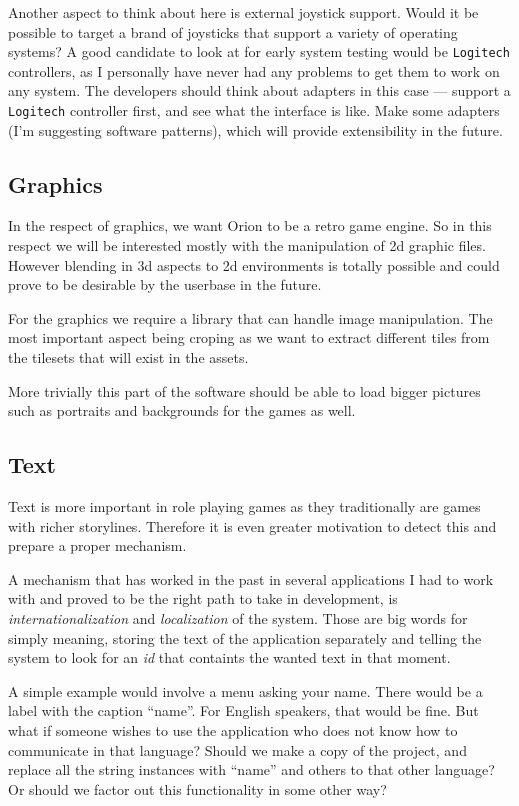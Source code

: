 Another aspect to think about here is external joystick support. Would it be
possible to target a brand of joysticks that support a variety of operating
systems? A good candidate to look at for early system testing would be
\texttt{Logitech} controllers, as I personally have never had any problems to
get them to work on any system. The developers should think about adapters in
this case --- support a \texttt{Logitech} controller first, and see what the
interface is like. Make some adapters (I'm suggesting software patterns), which
will provide extensibility in the future.

\subsection{Graphics}

In the respect of graphics, we want Orion to be a retro game engine. So in this
respect we will be interested mostly with the manipulation of 2d graphic files.
However blending in 3d aspects to 2d environments is totally possible and could
prove to be desirable by the userbase in the future.

For the graphics we require a library that can handle image manipulation. The
most important aspect being croping as we want to extract different tiles from
the tilesets that will exist in the assets.

More trivially this part of the software should be able to load bigger pictures
such as portraits and backgrounds for the games as well.

\subsection{Text}

Text is more important in role playing games as they traditionally are games
with richer storylines. Therefore it is even greater motivation to detect this
and prepare a proper mechanism.

A mechanism that has worked in the past in several applications I had to work
with and proved to be the right path to take in development, is
\textit{internationalization} and \textit{localization} of the system. Those
are big words for simply meaning, storing the text of the application separately
and telling the system to look for an \textit{id} that containts the wanted
text in that moment.

A simple example would involve a menu asking your name. There would be a label
with the caption ``name''. For English speakers, that would be fine. But what
if someone wishes to use the application who does not know how to communicate
in that language? Should we make a copy of the project, and replace all the
string instances with ``name'' and others to that other language? Or should we
factor out this functionality in some other way?

